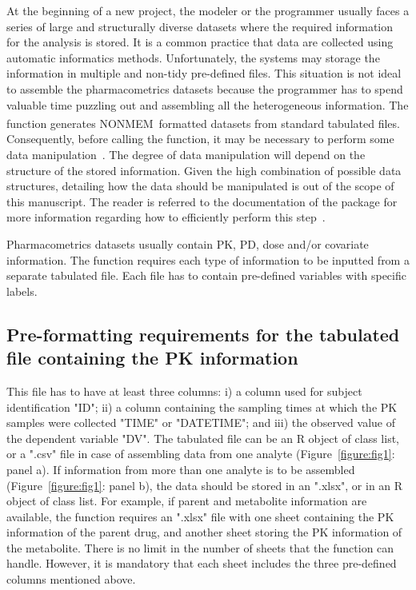 At the beginning of a new project, the modeler or the programmer usually faces a series of large and structurally diverse datasets where the required information for the analysis is stored. It is a common practice that data are collected using automatic informatics methods. Unfortunately, the systems may storage the information in multiple and non-tidy pre-defined files. This situation is not ideal to assemble the pharmacometrics datasets because the programmer has to spend valuable time puzzling out and assembling all the heterogeneous information. The  function generates NONMEM\textsuperscript{\textregistered}~formatted datasets from standard tabulated files. Consequently, before calling the  function, it may be necessary to perform some data manipulation~\citep{Wickham2016,Chen2017}.  The degree of data manipulation will depend on the structure of the stored information. Given the high combination of possible data structures, detailing how the data should be manipulated is out of the scope of this manuscript. The reader is referred to the documentation of the  package for more information regarding how to efficiently perform this step~\citep{Wickham2017}.   

Pharmacometrics datasets usually contain PK, PD, dose and/or covariate information. The  function requires each type of information to be inputted from a separate tabulated file. Each file has to contain pre-defined variables with specific labels.

\subsection{Pre-formatting requirements for the tabulated file containing the PK information}

This file has to have at least three columns: i) a column used for subject identification "ID"; ii) a column containing the sampling times at which the PK samples were collected "TIME" or "DATETIME"; and iii) the observed value of the dependent variable "DV". The tabulated file can be an R object of class list, or a ".csv" file in case of assembling data from one analyte (Figure~\ref{figure:fig1}: panel a). If information from more than one analyte is to be assembled (Figure~\ref{figure:fig1}: panel b), the data should be stored in an ".xlsx", or in an R object of class list. For example, if parent and metabolite information are available, the  function requires an ".xlsx" file with one sheet containing the PK information of the parent drug, and another sheet storing the PK information of the metabolite. There is no limit in the number of sheets that the  function can handle. However, it is mandatory that each sheet includes the three pre-defined columns mentioned above. 

